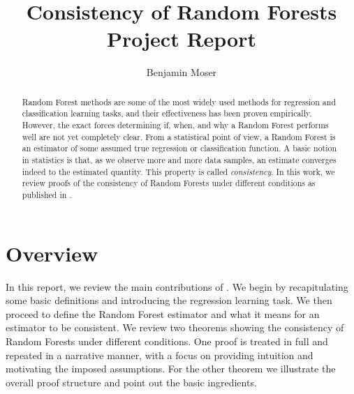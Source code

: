 \documentclass[10pt]{article}
\title{Consistency of Random Forests \\ \vspace{0.5em} \large Project Report}
\date{}
\author{Benjamin Moser}
\theoremstyle{definition}
\begin{document}


  \maketitle 
  \begin{abstract}

    Random Forest methods are some of the most widely used methods for
    regression and classification learning tasks, and their effectiveness has
    been proven empirically. However, the exact forces determining if, when, and
    why a Random Forest performs well are not yet completely clear.
%
    From a
    statistical point of view, a Random Forest is an estimator of some assumed
    true regression or classification function. A basic notion in statistics is
    that, as we observe more and more data samples, an estimate converges indeed
    to the estimated quantity. This property is called \textit{consistency}.
    In this work, we review proofs of the consistency of Random Forests under
    different conditions as published in \cite{Scornet2015}.
    

    
  \end{abstract}


  \section{Overview}

  
  In this report, we review the main contributions of \cite{Scornet2015}. We
  begin by recapitulating some basic definitions and introducing the regression
  learning task. We then proceed to define the Random Forest estimator and
  what it means for an estimator to be consistent. We review two theorems
  showing the consistency of Random Forests under different conditions.
  One proof is treated in full and repeated in a narrative manner, with a
  focus on providing intuition and motivating the imposed assumptions.
  For the other theorem we illustrate the overall proof structure and
  point out the basic ingredients.
\end{document}
